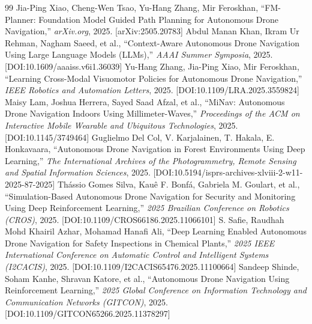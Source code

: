 \documentclass[10pt,twocolumn,letterpaper]{article}
\begin{document}
\begin{thebibliography}{99}
 Jia-Ping Xiao, Cheng-Wen Tsao, Yu-Hang Zhang, Mir Feroskhan, ``FM-Planner: Foundation Model Guided Path Planning for Autonomous Drone Navigation,'' \textit{arXiv.org}, 2025. [arXiv:2505.20783]
 Abdul Manan Khan, Ikram Ur Rehman, Nagham Saeed, et al., ``Context-Aware Autonomous Drone Navigation Using Large Language Models (LLMs),'' \textit{AAAI Summer Symposia}, 2025. [DOI:10.1609/aaaiss.v6i1.36039]
 Yu-Hang Zhang, Jia-Ping Xiao, Mir Feroskhan, ``Learning Cross-Modal Visuomotor Policies for Autonomous Drone Navigation,'' \textit{IEEE Robotics and Automation Letters}, 2025. [DOI:10.1109/LRA.2025.3559824]
 Maisy Lam, Joshua Herrera, Sayed Saad Afzal, et al., ``MiNav: Autonomous Drone Navigation Indoors Using Millimeter-Waves,'' \textit{Proceedings of the ACM on Interactive Mobile Wearable and Ubiquitous Technologies}, 2025. [DOI:10.1145/3749464]
 Guglielmo Del Col, V. Karjalainen, T. Hakala, E. Honkavaara, ``Autonomous Drone Navigation in Forest Environments Using Deep Learning,'' \textit{The International Archives of the Photogrammetry, Remote Sensing and Spatial Information Sciences}, 2025. [DOI:10.5194/isprs-archives-xlviii-2-w11-2025-87-2025]
 Thássio Gomes Silva, Kauê F. Bonfá, Gabriela M. Goulart, et al., ``Simulation-Based Autonomous Drone Navigation for Security and Monitoring Using Deep Reinforcement Learning,'' \textit{2025 Brazilian Conference on Robotics (CROS)}, 2025. [DOI:10.1109/CROS66186.2025.11066101]
 S. Safie, Raudhah Mohd Khairil Azhar, Mohamad Hanafi Ali, ``Deep Learning Enabled Autonomous Drone Navigation for Safety Inspections in Chemical Plants,'' \textit{2025 IEEE International Conference on Automatic Control and Intelligent Systems (I2CACIS)}, 2025. [DOI:10.1109/I2CACIS65476.2025.11100664]
 Sandeep Shinde, Soham Kanhe, Shravan Katore, et al., ``Autonomous Drone Navigation Using Reinforcement Learning,'' \textit{2025 Global Conference on Information Technology and Communication Networks (GITCON)}, 2025. [DOI:10.1109/GITCON65266.2025.11378297]
\end{thebibliography}
\end{document}
